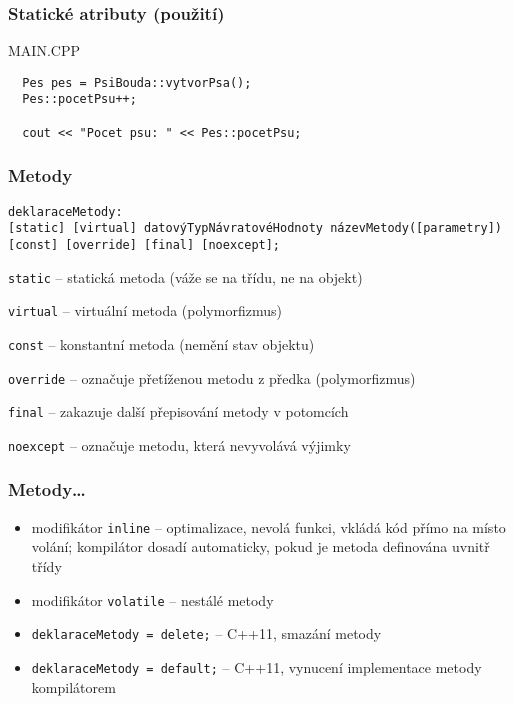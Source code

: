 \begin{frame}[fragile]
\frametitle{Statické atributy (použití)}
\begin{exampleblock}{MAIN.CPP}
\begin{lstlisting}
  Pes pes = PsiBouda::vytvorPsa();
  Pes::pocetPsu++;

  cout << "Pocet psu: " << Pes::pocetPsu;
\end{lstlisting}
\end{exampleblock}
\end{frame}



\begin{frame}[fragile]
\frametitle{Metody}

\begin{noteblock}{}
\begin{lstlisting}
deklaraceMetody:
[static] [virtual] datovýTypNávratovéHodnoty názevMetody([parametry]) [const] [override] [final] [noexcept];
\end{lstlisting}
\end{noteblock}

\begin{bitemize}
\item \lstinline|static| -- statická metoda (váže se na třídu, ne na objekt)
\item \lstinline|virtual| -- virtuální metoda (polymorfizmus)
\item \lstinline|const| -- konstantní metoda (nemění stav objektu)
\item \lstinline|override| -- označuje přetíženou metodu z předka (polymorfizmus)
\item \lstinline|final| -- zakazuje další přepisování metody v potomcích
\item \lstinline|noexcept| -- označuje metodu, která nevyvolává výjimky
\end{bitemize}
\end{frame}

\begin{frame}[fragile]
\frametitle{Metody\ldots}
\begin{bonusblock}{}
\begin{itemize}
\item modifikátor \lstinline|inline| -- optimalizace, nevolá funkci, vkládá kód přímo na místo volání; kompilátor dosadí automaticky, pokud je metoda definována uvnitř třídy
\item modifikátor \lstinline|volatile| -- nestálé metody
\item \lstinline|deklaraceMetody = delete;| -- C++11, smazání metody
\item \lstinline|deklaraceMetody = default;| -- C++11, vynucení implementace metody kompilátorem
\end{itemize}
\end{bonusblock}
\end{frame}


